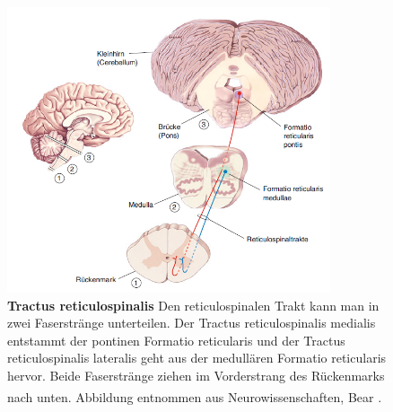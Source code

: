 \documentclass[12pt,a4paper,pdftex]{article}
\begin{document}
\begin{figure}[H]
    \centering
    \includegraphics[width=0.85\textwidth]{pictures/Bilder_Laura/reticulospinaler_tract.PNG}
    \caption[Tractus reticulospinalis]{\textbf{Tractus reticulospinalis} Den reticulospinalen Trakt kann man in zwei Faserstränge unterteilen.  Der Tractus reticulospinalis medialis entstammt der pontinen Formatio reticularis und der Tractus reticulospinalis lateralis geht aus der medullären Formatio reticularis hervor. Beide Faserstränge ziehen im Vorderstrang des Rückenmarks nach unten. Abbildung entnommen aus Neurowissenschaften, Bear \textsuperscript{\cite[14]{neurowissenschaften_baer}}.}
    \label{fig:tr_reticulospinalis}
\end{figure}
\end{document}
